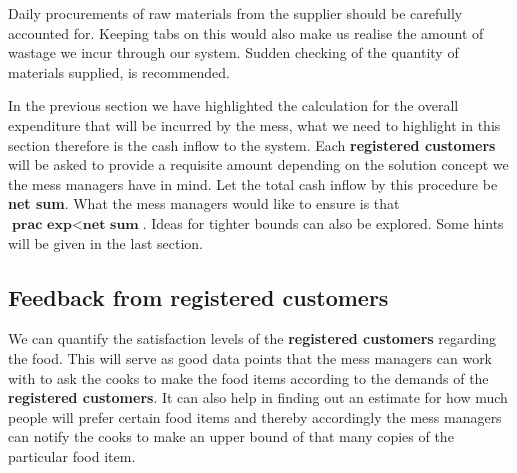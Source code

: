 \documentclass[12pt]{report}
\newcommand{\RC}{\textbf{registered customers}}
\begin{document}
Daily procurements of raw materials from the supplier should be carefully accounted for. Keeping tabs on this would also make us realise the amount of wastage we incur through our system. Sudden checking of the quantity of materials supplied, is recommended.  

In the previous section we have highlighted the calculation for the overall expenditure that will be incurred by the mess, what we need to highlight in this section therefore is the cash inflow to the system. Each {\RC} will be asked to provide a requisite amount depending on the solution concept we the mess managers have in mind. Let the total cash inflow by this procedure be \textbf{net sum}. What the mess managers would like to ensure is that $\textbf{prac exp} < \textbf{net sum}$. Ideas for tighter bounds can also be explored. Some hints will be given in the last section.



\subsection{Feedback from {\RC}}
We can quantify the satisfaction levels of the {\RC} regarding the food. This will serve as good data points that the mess managers can work with to ask the cooks to make the food items according to the demands of the {\RC}. It can also help in finding out an estimate for how much people will prefer certain food items and thereby accordingly the mess managers can notify the cooks to make an upper bound of that many copies of the particular food item.
\end{document}
